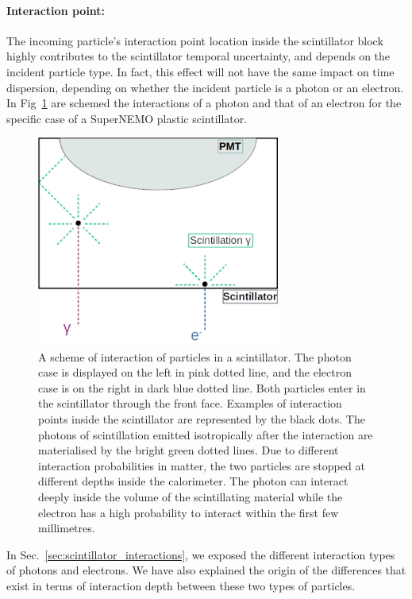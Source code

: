 \paragraph{Interaction point:}
The incoming particle's interaction point location inside the scintillator block highly contributes to the scintillator temporal uncertainty, and depends on the incident particle type.
In fact, this effect will not have the same impact on time dispersion, depending on whether the incident particle is a photon or an electron.
In Fig~\ref{fig:photon_scintilator} are schemed the interactions of a photon and that of an electron for the specific case of a SuperNEMO plastic scintillator.
\begin{figure}[h]
  \centering
  \includegraphics[width=8cm]{commissioning/fig_commissioning/Co_multi_reflection.pdf}
  \caption{A scheme of interaction of particles in a scintillator.
    The photon case is displayed on the left in pink dotted line, and the electron case is on the right in dark blue dotted line.
    Both particles enter in the scintillator through the front face.
    Examples of interaction points inside the scintillator are represented by the black dots.
    The photons of scintillation emitted isotropically after the interaction are materialised by the bright green dotted lines.
    Due to different interaction probabilities in matter, the two particles are stopped at different depths inside the calorimeter.
    The photon can interact deeply inside the volume of the scintillating material while the electron has a high probability to interact within the first few millimetres.
    \label{fig:photon_scintilator}}
\end{figure}
In Sec.~\ref{sec:scintillator_interactions}, we exposed the different interaction types of photons and electrons.
We have also explained the origin of the differences that exist in terms of interaction depth between these two types of particles.
